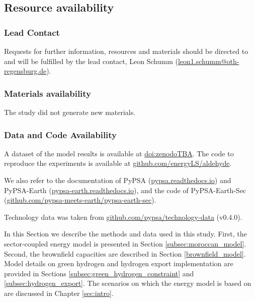 

\subsection*{Resource availability}

\subsubsection*{Lead Contact}

Requests for further information, resources and materials should be directed to and will be fulfilled by the lead contact, Leon Schumm
(\href{mailto:leon1.schumm@oth-regensburg.de}{leon1.schumm@oth-regensburg.de}).

\subsubsection*{Materials availability}
The study did not generate new materials.



\subsubsection*{Data and Code Availability}

A dataset of the model results is available at \href{zenodoTBA}{doi:zenodoTBA}.
The code to reproduce the experiments is available at \href{https://github.com/energyLS/aldehyde}{github.com/energyLS/aldehyde}.

We also refer to the documentation of PyPSA
(\href{https://pypsa.readthedocs.io}{pypsa.readthedocs.io}) and PyPSA-Earth (\href{https://pypsa-earth.readthedocs.io}{pypsa-earth.readthedocs.io}), and the code of PyPSA-Earth-Sec
(\href{https://github.com/pypsa-meets-earth/pypsa-earth-sec}{github.com/pypsa-meets-earth/pypsa-earth-sec}).

Technology data was taken from
\href{https://github.com/pypsa/technology-data}{github.com/pypsa/technology-data} (v0.4.0).


In this Section we describe the methods and data used in this study. First, the sector-coupled energy model is presented in Section \ref{subsec:moroccan_model}. Second, the brownfield capacities are described in Section \ref{brownfield_model}. Model details on green hydrogen and hydrogen export implementation are provided in Sections \ref{subsec:green_hydrogen_constraint} and \ref{subsec:hydrogen_export}. The scenarios on which the energy model is based on are discussed in Chapter \ref{sec:intro}.


